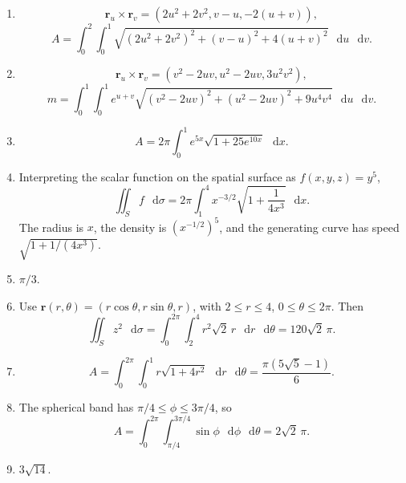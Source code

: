 \documentclass[11pt,letterpaper]{article}
\renewcommand{\vec}[1]{\mathbf{#1}}
\newcommand{\dd}{\mathop{}\!\mathrm{d}}
\begin{document}
\newpage
\begin{enumerate}[start=14]
\item
\[
\vec r_u\times\vec r_v=(2u^2+2v^2,v-u,-2(u+v)),
\]
\[
\boxed{A=\int_0^2\int_0^1
\sqrt{(2u^2+2v^2)^2+(v-u)^2+4(u+v)^2}\,\dd u\,\dd v}.
\]

\item
\[
\vec r_u\times\vec r_v=(v^2-2uv,u^2-2uv,3u^2v^2),
\]
\[
\boxed{m=\int_0^1\int_0^1 e^{u+v}
\sqrt{(v^2-2uv)^2+(u^2-2uv)^2+9u^4v^4}\,\dd u\,\dd v}.
\]

\item
\[
\boxed{A=2\pi\int_0^1e^{5x}\sqrt{1+25e^{10x}}\,\dd x}.
\]

\item Interpreting the scalar function on the spatial surface as
$f(x,y,z)=y^5$,
\[
\boxed{\iint_S f\,\dd\sigma
=2\pi\int_1^4x^{-3/2}\sqrt{1+\frac1{4x^3}}\,\dd x}.
\]
The radius is $x$, the density is $(x^{-1/2})^5$, and the generating
curve has speed $\sqrt{1+1/(4x^3)}$.

\item $\boxed{\pi/3}$.

\item Use $\vec r(r,\theta)=(r\cos\theta,r\sin\theta,r)$,
with $2\le r\le4$, $0\le\theta\le2\pi$. Then
\[
\iint_S z^2\,\dd\sigma
=\int_0^{2\pi}\int_2^4r^2\sqrt2\,r\,\dd r\,\dd\theta
=\boxed{120\sqrt2\,\pi}.
\]

\item
\[
A=\int_0^{2\pi}\int_0^1r\sqrt{1+4r^2}\,\dd r\,\dd\theta
=\boxed{\frac{\pi(5\sqrt5-1)}6}.
\]

\item The spherical band has $\pi/4\le\phi\le3\pi/4$, so
\[
A=\int_0^{2\pi}\int_{\pi/4}^{3\pi/4}\sin\phi\,\dd\phi\,\dd\theta
=\boxed{2\sqrt2\,\pi}.
\]

\item $\boxed{3\sqrt{14}}$.
\end{enumerate}
\end{document}
